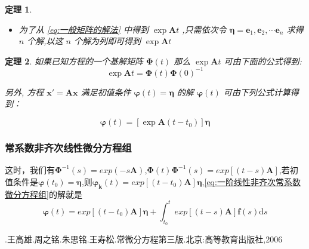 \documentclass{ctexart}
\newtheorem{theorem}{定理}[section]
\numberwithin{equation}{subsection}
\begin{document}
\begin{itemize}
\begin{theorem}
\begin{itemize}
{        满足初值条件 $\varphi(0)=\eta$ 的解
        \[\begin{aligned} \varphi(t)=(\exp \boldsymbol{A} t)\boldsymbol{\eta}=\mathrm{e}^{\lambda t} \sum_{i=0}^{n-1} \frac{t^{i}}{i !}(\boldsymbol{A}-\lambda \boldsymbol{E})^{i}\eta \end{aligned}\]}:
        \begin{equation}
        \label{eq:一般矩阵的解法}\boldsymbol{\varphi}(t)=\sum_{j=1}^{k} \mathrm{e}^{\lambda_jt}\left[\sum_{i=0}^{n_{j}-1} \frac{t^{i}}{i !}\left(\boldsymbol{A}-\lambda_{j} \boldsymbol{E}\right)^{i}\right] \boldsymbol{v}_{j}
        \end{equation}
        \item 为了从 \eqref{eq:一般矩阵的解法} 中得到 $\exp\boldsymbol{A}t$ ,只需依次令 $\boldsymbol{\eta}=\boldsymbol{e}_1,\boldsymbol{e}_2,\cdots\boldsymbol{e}_n$ 求得 $n$ 个解,以这 $n$ 个解为列即可得到 $\exp\boldsymbol{A}t$
        \end{itemize}
        \end{theorem}
        \end{itemize}
        \begin{theorem}
                如果已知方程的一个基解矩阵 $\boldsymbol{\Phi}(t)$ 那么 $\exp \boldsymbol{A}t$ 可由下面的公式得到:
                \[\exp \boldsymbol{A}t=\boldsymbol{\Phi}(t)\boldsymbol{\Phi}(0)^{-1}\]
                
                另外, 方程 $\boldsymbol{x}'=\boldsymbol{Ax}$ 满足初值条件 $\boldsymbol{\varphi}(t)=\boldsymbol{\eta}$ 的解 $\boldsymbol{\varphi}(t)$ 可由下列公式计算得到：

                \[\boldsymbol{\varphi}(t)=[\exp \boldsymbol{A}(t-t_0)]\boldsymbol{\eta}\]
        
        \end{theorem}
\subsubsection{常系数非齐次线性微分方程组}
这时，我们有$\boldsymbol{\Phi}^{-1}(s)=exp(-s\boldsymbol{A})$,$\boldsymbol{\Phi}(t)\boldsymbol{\Phi}^{-1}(s)=exp[(t-s)\boldsymbol{A}]$,若初值条件是$\boldsymbol{\varphi}(t_0)=\boldsymbol{\eta}$,则$\boldsymbol{\varphi_k}(t)=exp[(t-t_0)\boldsymbol{A}]\boldsymbol{\eta}$,\eqref{eq:一阶线性非齐次常系数微分方程组}的解就是
\textcolor[rgb]{1,0,0}{\begin{equation}
        \label{eq:常数变易公式五}
        \boldsymbol{\varphi}(t)=exp[(t-t_0)\boldsymbol{A}]\boldsymbol{\eta}+\int_{t_{0}}^{t} exp[(t-s)\boldsymbol{A}] \boldsymbol{f}(s) \mathrm{d} s
\end{equation} }
\begin{thebibliography}{99}
\bibitem[1] .王高雄.周之铭.朱思铭.王寿松.常微分方程第三版.北京:高等教育出版社,2006
\end{thebibliography}
\newpage
\end{document}

